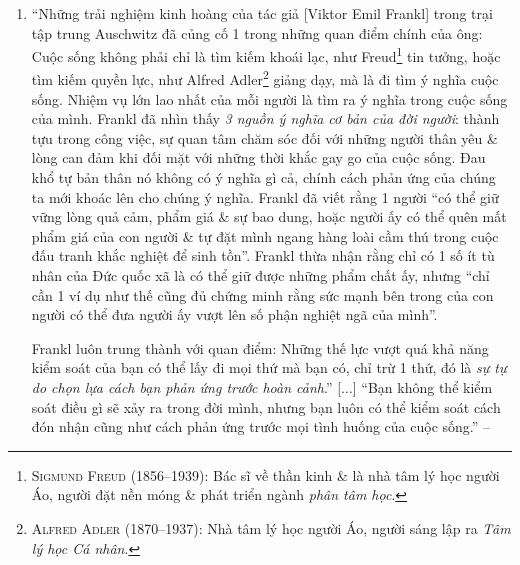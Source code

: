\documentclass[oneside]{book}
\numberwithin{equation}{section}
\begin{document}
\begin{enumerate}[leftmargin=0mm]
	``He describes poignantly\footnote{\textbf{poignantly} [adv] in a way that has a strong effect on your feelings, especially when it makes you feel sad, \textsc{synonym}: \textbf{movingly}.} the prisoners who gave up on life, who had lost all hope for a future \& were inevitably\footnote{\textbf{inevitably} [adv] as is certain to happen.} the 1st to die. They died less from lack of food or lack of medicine than from lack of hope, lack of something to live for.'' -- \cite[Preface by \textsc{Harold S. Kushner}, p. 9]{Frankl2013}
	\item ``Những trải nghiệm kinh hoàng của tác giả [Viktor Emil Frankl] trong trại tập trung Auschwitz đã củng cố 1 trong những quan điểm chính của ông: Cuộc sống không phải chỉ là tìm kiếm khoái lạc, như Freud\footnote{\textsc{Sigmund Freud} (1856--1939): Bác sĩ về thần kinh \& là nhà tâm lý học người Áo, người đặt nền móng \& phát triển ngành \textit{phân tâm học}.} tin tưởng, hoặc tìm kiếm quyền lực, như Alfred Adler\footnote{\textsc{Alfred Adler} (1870--1937): Nhà tâm lý học người Áo, người sáng lập ra \textit{Tâm lý học Cá nhân}.} giảng dạy, mà là đi tìm ý nghĩa cuộc sống. Nhiệm vụ lớn lao nhất của mỗi người là tìm ra ý nghĩa trong cuộc sống của mình. Frankl đã nhìn thấy \textit{3 nguồn ý nghĩa cơ bản của đời người}: thành tựu trong công việc, sự quan tâm chăm sóc đối với những người thân yêu \& lòng can đảm khi đối mặt với những thời khắc gay go của cuộc sống. Đau khổ tự bản thân nó không có ý nghĩa gì cả, chính cách phản ứng của chúng ta mới khoác lên cho chúng ý nghĩa. Frankl đã viết rằng 1 người ``có thể giữ vững lòng quả cảm, phẩm giá \& sự bao dung, hoặc người ấy có thể quên mất phẩm giá của con người \& tự đặt mình ngang hàng loài cầm thú trong cuộc đấu tranh khắc nghiệt để sinh tồn''. Frankl thừa nhận rằng chỉ có 1 số ít tù nhân của Đức quốc xã là có thể giữ được những phẩm chất ấy, nhưng ``chỉ cần 1 ví dụ như thế cũng đủ chứng minh rằng sức mạnh bên trong của con người có thể đưa người ấy vượt lên số phận nghiệt ngã của mình''.
	
	Frankl luôn trung thành với quan điểm: Những thế lực vượt quá khả năng kiểm soát của bạn có thể lấy đi mọi thứ mà bạn có, chỉ trừ 1 thứ, đó là \textit{sự tự do chọn lựa cách bạn phản ứng trước hoàn cảnh}.'' [$\ldots$] ``Bạn không thể kiểm soát điều gì sẽ xảy ra trong đời mình, nhưng bạn luôn có thể kiểm soát cách đón nhận cũng như cách phản ứng trước mọi tình huống của cuộc sống.'' -- \cite[pp. 6--7]{Frankl2022}
	

\end{enumerate}
\end{document}
